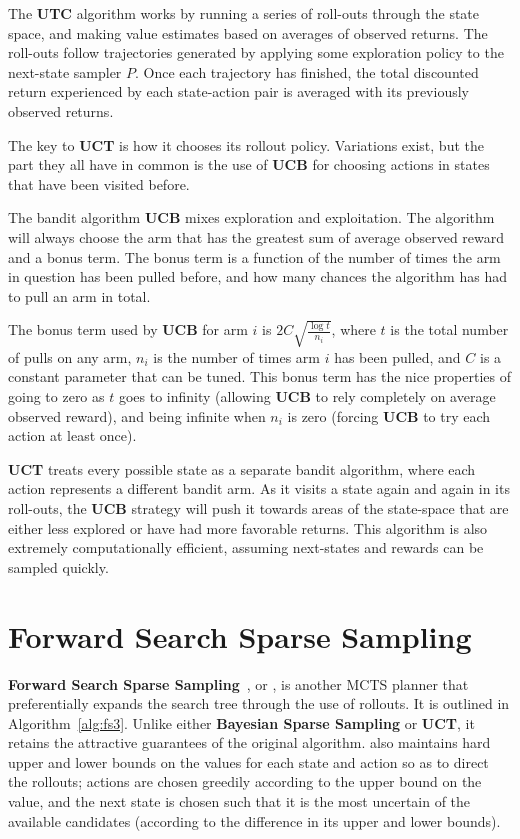 The {\bf UTC} algorithm works by running a series of roll-outs through the state space, and making value estimates based on averages of observed returns. The roll-outs follow trajectories generated by applying some exploration policy to the next-state sampler $P$. Once each trajectory has finished, the total discounted return experienced by each state-action pair is averaged with its previously observed returns.

The key to {\bf UCT} is how it chooses its rollout policy. Variations exist, but the part they all have in common is the use of {\bf UCB} for choosing actions in states that have been visited before.

The bandit algorithm {\bf UCB} mixes exploration and exploitation. The algorithm will always choose the arm that has the greatest sum of average observed reward and a bonus term. The bonus term is a function of the number of times the arm in question has been pulled before, and how many chances the algorithm has had to pull an arm in total.

The bonus term used by {\bf UCB} for arm $i$ is $2 C \sqrt{\frac{\log t}{n_i}}$, where $t$ is the total number of pulls on any arm, $n_i$ is the number of times arm $i$ has been pulled, and $C$ is a constant parameter that can be tuned. This bonus term has the nice properties of going to zero as $t$ goes to infinity (allowing {\bf UCB} to rely completely on average observed reward), and being infinite when $n_i$ is zero (forcing {\bf UCB} to try each action at least once).


{\bf UCT} treats every possible state as a separate bandit algorithm, where each action represents a different bandit arm. As it visits a state again and again in its roll-outs, the {\bf UCB} strategy will push it towards areas of the state-space that are either less explored or have had more favorable returns. This algorithm is also extremely computationally efficient, assuming next-states and rewards can be sampled quickly.

\section{Forward Search Sparse Sampling}

\label{sec:rel:fsss}

{\bf Forward Search Sparse Sampling}~\cite{walsh10}, or , is another MCTS planner that preferentially expands the search tree through the use of rollouts. It is outlined in Algorithm~\ref{alg:fs3}. Unlike either {\bf Bayesian Sparse Sampling} or {\bf UCT}, it retains the attractive guarantees of the original  algorithm.  also maintains hard upper and lower bounds on the values for each state and action so as to direct the rollouts; actions are chosen greedily according to the upper bound on the value, and the next state is chosen such that it is the most uncertain of the available candidates (according to the difference in its upper and lower bounds).


